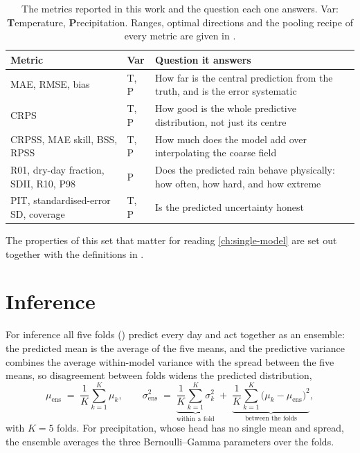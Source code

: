 \begin{table}[htbp]
    \centering
    \caption[Evaluation metrics at a glance]{The metrics reported in this work and the question each
    one answers. Var: \textbf{T}emperature, \textbf{P}recipitation. Ranges, optimal directions and the
    pooling recipe of every metric are given in .}
    \label{tab:meth-metrics-summary}
    \footnotesize
    \begin{tabular}{|>{\raggedright\arraybackslash}p{4.6cm}|>{\centering\arraybackslash}p{0.7cm}|>{\raggedright\arraybackslash}p{7.4cm}|}
        \hline
        \textbf{Metric} & \textbf{Var} & \textbf{Question it answers} \\
        \hline
        MAE, RMSE, bias & T, P & How far is the central prediction from the truth, and is the error systematic \\
        \hline
        CRPS & T, P & How good is the whole predictive distribution, not just its centre \\
        \hline
        CRPSS, MAE skill, BSS, RPSS & T, P & How much does the model add over interpolating the coarse field \\
        \hline
        R01, dry-day fraction, SDII, R10, P98 & P & Does the predicted rain behave physically: how often, how hard, and how extreme \\
        \hline
        PIT, standardised-error SD, coverage & T, P & Is the predicted uncertainty honest \\
        \hline
    \end{tabular}
\end{table}


The properties of this set that matter for reading \cref{ch:single-model} are set out together
with the definitions in .
\section{Inference}\label{sec:meth-inference}

For inference all five folds () predict every day and act together as an ensemble: the predicted mean is the average of the five means, and the predictive variance combines the average within-model variance with the spread between the five means, so disagreement between folds widens the predicted distribution,
\begin{equation}
    \mu_{\mathrm{ens}} \;=\; \frac{1}{K}\sum_{k=1}^{K} \mu_k,
    \qquad
    \sigma^{2}_{\mathrm{ens}} \;=\; \underbrace{\frac{1}{K}\sum_{k=1}^{K} \sigma_k^{2}}_{\text{within a fold}}
    \;+\; \underbrace{\frac{1}{K}\sum_{k=1}^{K} \bigl(\mu_k - \mu_{\mathrm{ens}}\bigr)^{2}}_{\text{between the folds}},
    \label{eq:fold-ensemble}
\end{equation}
with $K = 5$ folds. For precipitation, whose head has no single mean and spread, the ensemble averages the three Bernoulli--Gamma parameters over the folds.


